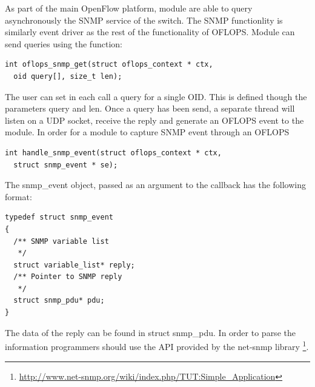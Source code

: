 \documentclass{book}
\begin{document}
As part of the main OpenFlow platform, module are able to query asynchronously the SNMP service of the switch.
The SNMP functionlity is similarly event driver as the rest of the functionality of OFLOPS. Module can send queries
using the function:
\begin{lstlisting}
int oflops_snmp_get(struct oflops_context * ctx, 
  oid query[], size_t len);
\end{lstlisting}

The user can set in each call a query for a single OID. This is defined though the parameters query and len. Once
a query has been send, a separate thread will listen on a UDP socket, receive the reply and generate an OFLOPS 
event to the module. In order for a module to capture SNMP event through an OFLOPS 

\begin{lstlisting}
int handle_snmp_event(struct oflops_context * ctx, 
  struct snmp_event * se);
\end{lstlisting}

The snmp\_event object, passed as an argument to the callback has the following format:
\begin{lstlisting}
typedef struct snmp_event
{
  /** SNMP variable list
   */
  struct variable_list* reply;
  /** Pointer to SNMP reply
   */
  struct snmp_pdu* pdu;
}
\end{lstlisting}

The data of the reply can be found in struct snmp\_pdu. In order to parse the information programmers should use
the API provided by the net-snmp library \footnote{\url{http://www.net-snmp.org/wiki/index.php/TUT:Simple_Application}}. 

  
\end{document}
